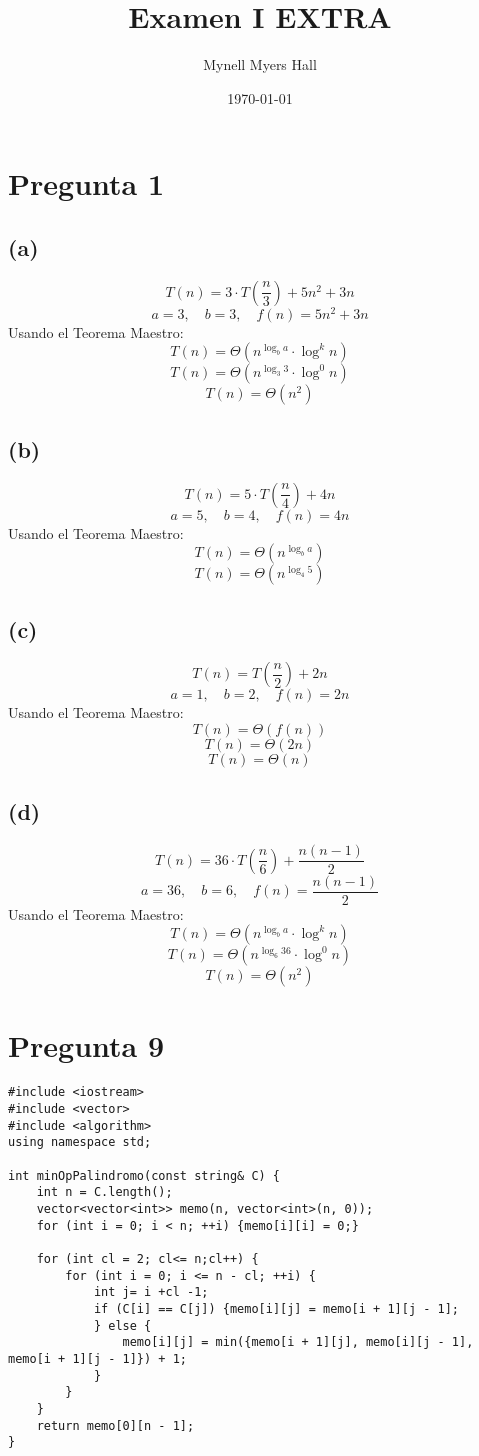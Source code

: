 \documentclass{article}
\title{Examen I EXTRA}
\author{Mynell Myers Hall}
\date{\today}
\begin{document}
\maketitle

\section*{Pregunta 1}

\subsection*{(a)}
\[
T(n) = 3 \cdot T\left(\frac{n}{3}\right) + 5n^2 + 3n
\]
\[
a = 3, \quad b = 3, \quad f(n) = 5n^2 + 3n
\]
Usando el Teorema Maestro:
\[
T(n) = \Theta(n^{\log_b a} \cdot \log^k n)
\]
\[
T(n) = \Theta(n^{\log_3 3} \cdot \log^0 n)
\]
\[
T(n) = \Theta(n^2)
\]

\subsection*{(b)}
\[
T(n) = 5 \cdot T\left(\frac{n}{4}\right) + 4n
\]
\[
a = 5, \quad b = 4, \quad f(n) = 4n
\]
Usando el Teorema Maestro:
\[
T(n) = \Theta(n^{\log_b a})
\]
\[
T(n) = \Theta(n^{\log_4 5})
\]

\subsection*{(c)}
\[
T(n) = T\left(\frac{n}{2}\right) + 2n
\]
\[
a = 1, \quad b = 2, \quad f(n) = 2n
\]
Usando el Teorema Maestro:
\[
T(n) = \Theta(f(n))
\]
\[
T(n) = \Theta(2n)
\]
\[
T(n) = \Theta(n)
\]

\subsection*{(d)}
\[
T(n) = 36 \cdot T\left(\frac{n}{6}\right) + \frac{n(n-1)}{2}
\]
\[
a = 36, \quad b = 6, \quad f(n) = \frac{n(n-1)}{2}
\]
Usando el Teorema Maestro:
\[
T(n) = \Theta(n^{\log_b a} \cdot \log^k n)
\]
\[
T(n) = \Theta(n^{\log_6 36} \cdot \log^0 n)
\]
\[
T(n) = \Theta(n^2)
\]

\section*{Pregunta 9}

\begin{lstlisting}[style=customcpp]
#include <iostream>
#include <vector>
#include <algorithm>
using namespace std;

int minOpPalindromo(const string& C) {
    int n = C.length();
    vector<vector<int>> memo(n, vector<int>(n, 0));
    for (int i = 0; i < n; ++i) {memo[i][i] = 0;}

    for (int cl = 2; cl<= n;cl++) {
        for (int i = 0; i <= n - cl; ++i) {
            int j= i +cl -1;
            if (C[i] == C[j]) {memo[i][j] = memo[i + 1][j - 1];
            } else {
                memo[i][j] = min({memo[i + 1][j], memo[i][j - 1], memo[i + 1][j - 1]}) + 1;
            }
        }
    }
    return memo[0][n - 1];
}
\end{lstlisting}
\end{document}
